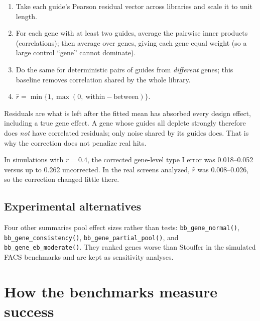 \documentclass[11pt]{article}
\begin{document}
\begin{enumerate}[itemsep=2pt]
\item Take each guide's Pearson residual vector across libraries and scale it
to unit length.
\item For each gene with at least two guides, average the pairwise inner
products (correlations); then average over genes, giving each gene equal
weight (so a large control ``gene'' cannot dominate).
\item Do the same for deterministic pairs of guides from \emph{different}
genes; this baseline removes correlation shared by the whole library.
\item $\hat r=\min\{1,\max(0,\ \text{within}-\text{between})\}$.
\end{enumerate}

\begin{keyidea}
Residuals are what is left after the fitted mean has absorbed every design
effect, including a true gene effect.  A gene whose guides all deplete
strongly therefore does \emph{not} have correlated residuals; only noise
shared by its guides does.  That is why the correction does not penalize real
hits.
\end{keyidea}

In simulations with $r=0.4$, the corrected gene-level type I error was
0.018--0.052 versus up to 0.262 uncorrected.  In the real screens analyzed,
$\hat r$ was 0.008--0.026, so the correction changed little there.

\subsection{Experimental alternatives}

Four other summaries pool effect sizes rather than tests:
\texttt{bb\_gene\_normal()}, \texttt{bb\_gene\_consistency()},
\texttt{bb\_gene\_partial\_pool()}, and
\texttt{bb\_gene\_eb\_moderate()}.  They ranked genes worse than Stouffer in
the simulated FACS benchmarks and are kept as sensitivity analyses.

\section{How the benchmarks measure success}
\end{document}
